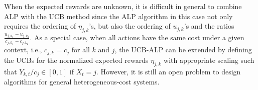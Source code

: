 {When the expected rewards are unknown, it is difficult in general to combine ALP with the UCB method since the ALP algorithm in this case not only requires the ordering of $\eta_{j,k}$'s, but also the ordering of $u_{j,k}$'s and the ratios $\frac{u_{j,k_1} - u_{j, k_2}}{c_{j,k_1} - c_{j, k_2}}$. As a special case, when all actions have the same cost under a given context, i.e., $c_{j,k} = c_j$ for all $k$ and $j$, the UCB-ALP can be extended  by defining the UCBs for the normalized expected rewards $\eta_{j,k}$ with appropriate scaling such that $Y_{k,t}/c_j \in [0,1]$ if $X_t = j$. However, it is still an open problem to design algorithms for general heterogeneous-cost systems.}






